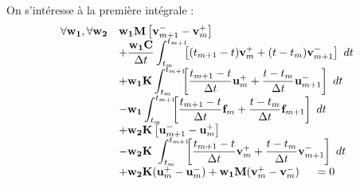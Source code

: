 \documentclass[12pt,a4paper]{report}
\begin{document}
On s'intéresse à la première intégrale :
\begin{equation}
\begin{array}{r l}
	\forall \mathbf{w_1},\forall \mathbf{w_2}
	&\displaystyle
	 \mathbf{w_1} \mathbf{M}
		\left[ \mathbf{v}_{m+1}^- - \mathbf{v}_m^+ \right]
	\\ 
	  &\displaystyle
	  +\frac{\mathbf{w_1} \mathbf{C}}{\Delta t}\int_{t_m}^{t_{m+1}} \!\!\! 	
		\left[
			(t_{m+1}-t) \mathbf{v}_m^+ + 
			(t-t_m) \mathbf{v}_{m+1}^- 
			\right] ~dt
	\\
	  &\displaystyle
	 +\mathbf{w_1} \mathbf{K}\int_{t_m}^{t_{m+1}} \!\!\! 	
		\left[
			\frac{t_{m+1}-t}{\Delta t} \mathbf{u}_m^+ + 
			\frac{t-t_m}{\Delta t} \mathbf{u}_{m+1}^- 
			\right] ~dt
	\\
	  &\displaystyle
	   -\mathbf{w_1} \int_{t_m}^{t_{m+1}} \!\!\!
		\left[
			\frac{t_{m+1}-t}{\Delta t} \mathbf{f}_m + 
			\frac{t-t_m}{\Delta t} \mathbf{f}_{m+1}
			\right] ~dt
	\\
	  &+\displaystyle
	    \mathbf{w_2} \mathbf{K}
		\left[ \mathbf{u}_{m+1}^- - \mathbf{u}_m^+ \right]
	\\
	  &\displaystyle	    
	    -\mathbf{w_2} \mathbf{K}~\int_{t_m}^{t_{m+1}} \!\!\! 	
		\left[
			\frac{t_{m+1}-t}{\Delta t} \mathbf{v}_m^+ + 
			\frac{t-t_m}{\Delta t} \mathbf{v}_{m+1}^- 
			\right] ~dt
	\\
	  &+ \mathbf{w_2} \mathbf{K} (\mathbf{u}_m^+ - \mathbf{u}_m^-)
	   +  \mathbf{w_1} \mathbf{M}(\mathbf{v}_m^+ - \mathbf{v}_m^-)
	~~~~=0
\end{array}
\end{equation}
\end{document}
